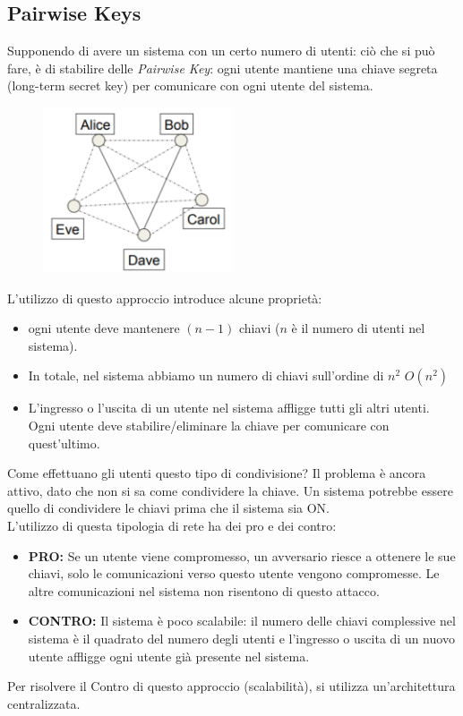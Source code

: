 \documentclass[a4paper,12pt]{article}
\begin{document}
\subsection{Pairwise Keys} Supponendo di avere un sistema con un certo numero di utenti:
ciò che si può fare, è di stabilire delle \textit{Pairwise Key}: ogni utente mantiene una chiave segreta (long-term secret key) per comunicare con ogni utente del sistema.
\begin{figure}[H]
	\centering
	\includegraphics[width=0.5\textwidth]{img/pairwise-key.png}
\end{figure}
L'utilizzo di questo approccio introduce alcune proprietà:
\begin{itemize}
	\item ogni utente deve mantenere $(n-1)$ chiavi ($n$ è il numero di utenti nel sistema).
	\item In totale, nel sistema abbiamo un numero di chiavi sull'ordine di $n^2$ $O(n^2)$
	\item L'ingresso o l'uscita di un utente nel sistema affligge tutti gli altri utenti. Ogni utente deve stabilire/eliminare la chiave per comunicare con quest'ultimo.
\end{itemize}
Come effettuano gli utenti questo tipo di condivisione? Il problema è ancora attivo, dato che non si sa come condividere la chiave. Un sistema potrebbe essere quello di condividere le chiavi prima che il sistema sia ON. \\
L'utilizzo di questa tipologia di rete ha dei pro e dei contro:
\begin{itemize}
	\item \textbf{PRO:} Se un utente viene compromesso, un avversario riesce a ottenere le sue chiavi, solo le comunicazioni verso questo utente vengono compromesse. Le altre comunicazioni nel sistema non risentono di questo attacco.
	\item \textbf{CONTRO:} Il sistema è poco scalabile: il numero delle chiavi complessive nel sistema è il quadrato del numero degli utenti e l'ingresso o uscita di un nuovo utente affligge ogni utente già presente nel sistema.
\end{itemize}
Per risolvere il Contro di questo approccio (scalabilità), si utilizza un'architettura centralizzata.
\end{document}
